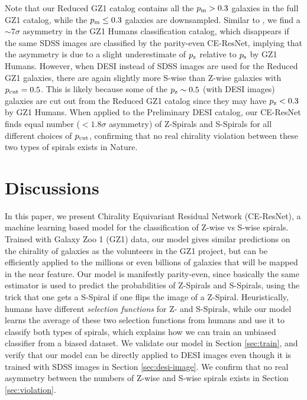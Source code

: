\documentclass[twocolumn]{aastex631}
\begin{document}
Note that our Reduced GZ1 catalog contains all the $p_{\rm m}>0.3$ galaxies in the full GZ1 catalog, while the $p_{\rm m}\leq0.3$ galaxies are downsampled.
Similar to \citet{hayes2017nature}, we find a $\sim 7\sigma$ asymmetry in the GZ1 Humans classification catalog, which disappears if the same SDSS images are classified by the parity-even CE-ResNet, implying that the asymmetry is due to a slight underestimate of $p_{\rm z}$ relative to $p_{\rm s}$ by GZ1 Humans.
However, when DESI instead of SDSS images are used for the Reduced GZ1 galaxies, there are again slightly more S-wise than Z-wise galaxies with $p_{\rm cut}=0.5$.
This is likely because some of the $p_{\rm z}\sim 0.5$ (with DESI images) galaxies are cut out from the Reduced GZ1 catalog since they may have $p_{\rm z}<0.3$ by GZ1 Humans.
When applied to the Preliminary DESI catalog, our CE-ResNet finds equal number ($<1.8\sigma$ asymmetry) of Z-Spirals and S-Spirals for all different choices of $p_{\rm cut}$, confirming that no real chirality violation between these two types of spirals exists in Nature.

\section{Discussions}

\label{sec:discuss}

In this paper, we present Chirality Equivariant Residual Network (CE-ResNet), a machine learning based model for the classification of Z-wise vs S-wise spirals.
Trained with Galaxy Zoo 1 (GZ1) data, our model gives similar predictions on the chirality of galaxies as the volunteers in the GZ1 project, but can be efficiently applied to the millions or even billions of galaxies that will be mapped in the near feature.
Our model is manifestly parity-even, since basically the same estimator is used to predict the probabilities of Z-Spirals and S-Spirals, using the trick that one gets a S-Spiral if one flips the image of a Z-Spiral.
Heuristically, humans have different \textit{selection functions} for Z- and S-Spirals, while our model learns the average of these two selection functions from humans and use it to classify both types of spirals, which explains how we can train an unbiased classifier from a biased dataset.
We validate our model in Section \ref{sec:train}, and verify that our model can be directly applied to DESI images even though it is trained with SDSS images in Section \ref{sec:desi-image}.
We confirm that no real asymmetry between the numbers of Z-wise and S-wise spirals exists in Section \ref{sec:violation}.
\end{document}
